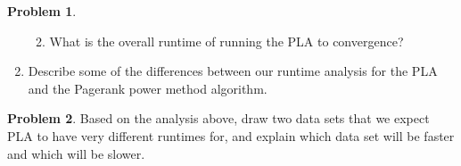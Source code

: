 \documentclass[10pt]{article}
\theoremstyle{definition}
\newtheorem{problem}{Problem}
\begin{document}
\begin{problem}
\begin{enumerate}
\begin{enumerate}
                    \vspace{4in}
                \item
            What is the overall runtime of running the PLA to convergence?
            \end{enumerate}

            \vspace{4in}
        \item
            Describe some of the differences between our runtime analysis for the PLA and the Pagerank power method algorithm.

        \end{enumerate}
\end{problem}
\newpage
\begin{problem}
    Based on the analysis above, draw two data sets that we expect PLA to have very different runtimes for, and explain which data set will be faster and which will be slower.
\end{problem}
\end{document}
